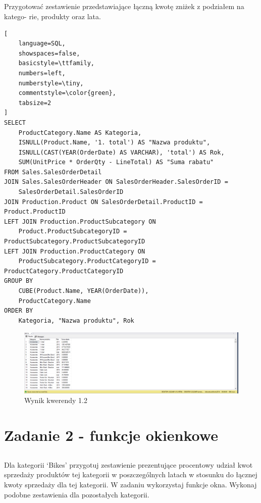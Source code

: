 \documentclass[a4paper,12pt]{article}
\begin{document}
\subsection{}

Przygotować zestawienie przedstawiające łączną kwotę zniżek z podziałem na katego-
rie, produkty oraz lata.

{\small
\begin{lstlisting}[
	language=SQL,
	showspaces=false,
	basicstyle=\ttfamily,
	numbers=left,
	numberstyle=\tiny,
	commentstyle=\color{green},
	tabsize=2
]
SELECT 
    ProductCategory.Name AS Kategoria, 
    ISNULL(Product.Name, '1. total') AS "Nazwa produktu", 
    ISNULL(CAST(YEAR(OrderDate) AS VARCHAR), 'total') AS Rok, 
    SUM(UnitPrice * OrderQty - LineTotal) AS "Suma rabatu" 
FROM Sales.SalesOrderDetail
JOIN Sales.SalesOrderHeader ON SalesOrderHeader.SalesOrderID = 
    SalesOrderDetail.SalesOrderID
JOIN Production.Product ON SalesOrderDetail.ProductID = Product.ProductID
LEFT JOIN Production.ProductSubcategory ON 
    Product.ProductSubcategoryID = ProductSubcategory.ProductSubcategoryID
LEFT JOIN Production.ProductCategory ON 
    ProductSubcategory.ProductCategoryID = ProductCategory.ProductCategoryID
GROUP BY 
    CUBE(Product.Name, YEAR(OrderDate)),
	ProductCategory.Name
ORDER BY 
    Kategoria, "Nazwa produktu", Rok
\end{lstlisting}}

\begin{figure}[H]
  \centering
  \includegraphics[width=1.0\textwidth]{images/1.2.png}
  \caption{Wynik kwerendy 1.2}
\end{figure}

\section{Zadanie 2 - funkcje okienkowe}

\subsection{}

Dla kategorii ‘Bikes’ przygotuj zestawienie prezentujące procentowy udział kwot
sprzedaży produktów tej kategorii w poszczególnych latach w stosunku do łącznej
kwoty sprzedaży dla tej kategorii. W zadaniu wykorzystaj funkcje okna.
Wykonaj podobne zestawienia dla pozostałych kategorii.
\end{document}

